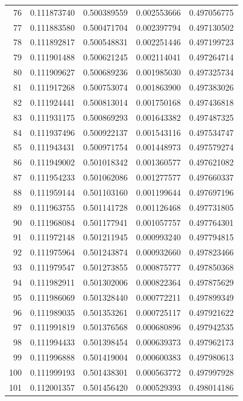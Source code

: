 \begin{tabular}{rcccc}
76 & 0.111873740 & 0.500389559 & 0.002553666 & 0.497056775 \\
77 & 0.111883580 & 0.500471704 & 0.002397794 & 0.497130502 \\
78 & 0.111892817 & 0.500548831 & 0.002251446 & 0.497199723 \\
79 & 0.111901488 & 0.500621245 & 0.002114041 & 0.497264714 \\
80 & 0.111909627 & 0.500689236 & 0.001985030 & 0.497325734 \\
81 & 0.111917268 & 0.500753074 & 0.001863900 & 0.497383026 \\
82 & 0.111924441 & 0.500813014 & 0.001750168 & 0.497436818 \\
83 & 0.111931175 & 0.500869293 & 0.001643382 & 0.497487325 \\
84 & 0.111937496 & 0.500922137 & 0.001543116 & 0.497534747 \\
85 & 0.111943431 & 0.500971754 & 0.001448973 & 0.497579274 \\
86 & 0.111949002 & 0.501018342 & 0.001360577 & 0.497621082 \\
87 & 0.111954233 & 0.501062086 & 0.001277577 & 0.497660337 \\
88 & 0.111959144 & 0.501103160 & 0.001199644 & 0.497697196 \\
89 & 0.111963755 & 0.501141728 & 0.001126468 & 0.497731805 \\
90 & 0.111968084 & 0.501177941 & 0.001057757 & 0.497764301 \\
91 & 0.111972148 & 0.501211945 & 0.000993240 & 0.497794815 \\
92 & 0.111975964 & 0.501243874 & 0.000932660 & 0.497823466 \\
93 & 0.111979547 & 0.501273855 & 0.000875777 & 0.497850368 \\
94 & 0.111982911 & 0.501302006 & 0.000822364 & 0.497875629 \\
95 & 0.111986069 & 0.501328440 & 0.000772211 & 0.497899349 \\
96 & 0.111989035 & 0.501353261 & 0.000725117 & 0.497921622 \\
97 & 0.111991819 & 0.501376568 & 0.000680896 & 0.497942535 \\
98 & 0.111994433 & 0.501398454 & 0.000639373 & 0.497962173 \\
99 & 0.111996888 & 0.501419004 & 0.000600383 & 0.497980613 \\
100 & 0.111999193 & 0.501438301 & 0.000563772 & 0.497997928 \\
101 & 0.112001357 & 0.501456420 & 0.000529393 & 0.498014186 \\

\end{tabular}
